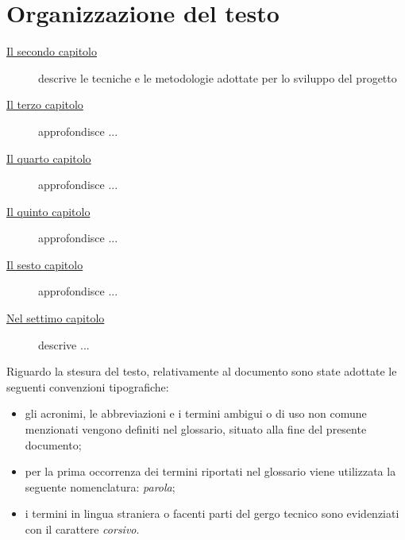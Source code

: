 \section{Organizzazione del testo}

\begin{description}
    \item[{\hyperref[cap:processi-metodologie]{Il secondo capitolo}}] descrive le tecniche e le metodologie adottate per lo sviluppo del progetto
    
    \item[{\hyperref[cap:descrizione-stage]{Il terzo capitolo}}] approfondisce ...
    
    \item[{\hyperref[cap:analisi-requisiti]{Il quarto capitolo}}] approfondisce ...
    
    \item[{\hyperref[cap:progettazione-codifica]{Il quinto capitolo}}] approfondisce ...
    
    \item[{\hyperref[cap:verifica-validazione]{Il sesto capitolo}}] approfondisce ...
    
    \item[{\hyperref[cap:conclusioni]{Nel settimo capitolo}}] descrive ...
\end{description}

Riguardo la stesura del testo, relativamente al documento sono state adottate le seguenti convenzioni tipografiche:
\begin{itemize}
	\item gli acronimi, le abbreviazioni e i termini ambigui o di uso non comune menzionati vengono definiti nel glossario, situato alla fine del presente documento;
	\item per la prima occorrenza dei termini riportati nel glossario viene utilizzata la seguente nomenclatura: \emph{parola}\glsfirstoccur;
	\item i termini in lingua straniera o facenti parti del gergo tecnico sono evidenziati con il carattere \emph{corsivo}.
\end{itemize}
